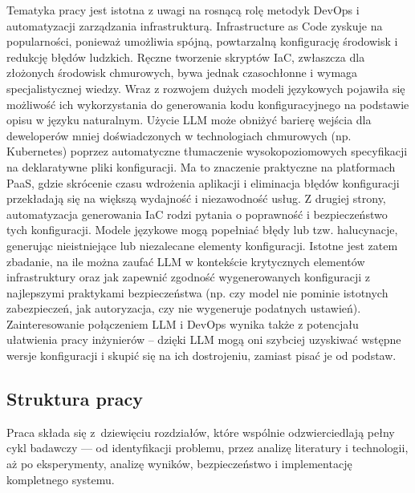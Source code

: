 Tematyka pracy jest istotna z uwagi na rosnącą rolę metodyk DevOps i automatyzacji zarządzania infrastrukturą. Infrastructure as Code zyskuje na popularności, ponieważ umożliwia spójną, powtarzalną konfigurację środowisk i redukcję błędów ludzkich. Ręczne tworzenie skryptów IaC, zwłaszcza dla złożonych środowisk chmurowych, bywa jednak czasochłonne i wymaga specjalistycznej wiedzy. Wraz z rozwojem dużych modeli językowych pojawiła się możliwość ich wykorzystania do generowania kodu konfiguracyjnego na podstawie opisu w języku naturalnym. Użycie LLM może obniżyć barierę wejścia dla deweloperów mniej doświadczonych w technologiach chmurowych (np. Kubernetes) poprzez automatyczne tłumaczenie wysokopoziomowych specyfikacji na deklaratywne pliki konfiguracji. Ma to znaczenie praktyczne na platformach PaaS, gdzie skrócenie czasu wdrożenia aplikacji i eliminacja błędów konfiguracji przekładają się na większą wydajność i niezawodność usług. Z drugiej strony, automatyzacja generowania IaC rodzi pytania o poprawność i bezpieczeństwo tych konfiguracji. Modele językowe mogą popełniać błędy lub tzw. halucynacje, generując nieistniejące lub niezalecane elementy konfiguracji. Istotne jest zatem zbadanie, na ile można zaufać LLM w kontekście krytycznych elementów infrastruktury oraz jak zapewnić zgodność wygenerowanych konfiguracji z najlepszymi praktykami bezpieczeństwa (np. czy model nie pominie istotnych zabezpieczeń, jak autoryzacja, czy nie wygeneruje podatnych ustawień). Zainteresowanie połączeniem LLM i DevOps wynika także z potencjału ułatwienia pracy inżynierów – dzięki LLM mogą oni szybciej uzyskiwać wstępne wersje konfiguracji i skupić się na ich dostrojeniu, zamiast pisać je od podstaw.

\subsection{Struktura pracy}

Praca składa się z dziewięciu rozdziałów, które wspólnie odzwierciedlają pełny cykl badawczy — od identyfikacji problemu, przez analizę literatury i technologii, aż po eksperymenty, analizę wyników, bezpieczeństwo i implementację kompletnego systemu.

